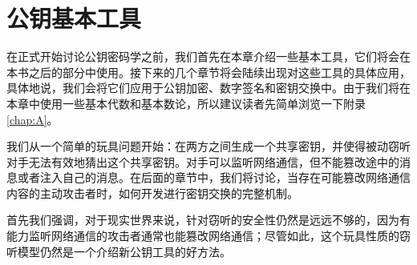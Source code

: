 \chapter{公钥基本工具}\label{chap:10}

在正式开始讨论公钥密码学之前，我们首先在本章介绍一些基本工具，它们将会在本书之后的部分中使用。接下来的几个章节将会陆续出现对这些工具的具体应用，具体地说，我们会将它们应用于公钥加密、数字签名和密钥交换中。由于我们将在本章中使用一些基本代数和基本数论，所以建议读者先简单浏览一下附录 \ref{chap:A}。

我们从一个简单的玩具问题开始：在两方之间生成一个共享密钥，并使得被动窃听对手无法有效地猜出这个共享密钥。对手可以监听网络通信，但不能篡改途中的消息或者注入自己的消息。在后面的章节中，我们将讨论，当存在可能篡改网络通信内容的主动攻击者时，如何开发进行密钥交换的完整机制。

首先我们强调，对于现实世界来说，针对窃听的安全性仍然是远远不够的，因为有能力监听网络通信的攻击者通常也能篡改网络通信；尽管如此，这个玩具性质的窃听模型仍然是一个介绍新公钥工具的好方法。











